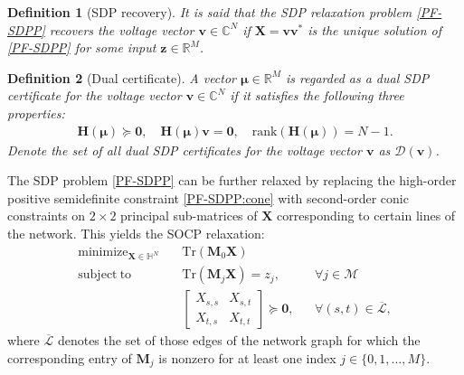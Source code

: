 \documentclass[journal,twoside]{IEEEtran}
\newtheorem{definition}{Definition}
\newcommand{\Tr}{\mathrm{Tr}}
\newcommand{\st}{\mathrm{subject~to}}
\newcommand{\bv}{\mathbf{v}}
\newcommand{\bz}{\mathbf{z}}
\newcommand{\bM}{\mathbf{M}}
\newcommand{\bX}{\mathbf{X}}
\newcommand{\cL}{{\mathcal L}}
\newcommand{\cM}{{\mathcal M}}
\DeclareMathOperator*{\mini}{\mathrm{minimize}}
\begin{document}
\begin{definition}[SDP recovery]
It is said that the SDP relaxation problem \eqref{PF-SDPP} recovers the voltage vector $\bv \in \mathbb{C}^N$ if $\bX=\bv\bv^{*}$ is the unique solution of \eqref{PF-SDPP} for some  input $\bz \in \mathbb{R}^M$.
\end{definition}



\begin{definition}[Dual certificate]
\label{dual_cer_def}
A vector $\boldsymbol{\mu}\in\mathbb{R}^M$ is regarded as a dual SDP certificate for the voltage vector $\mathbf{v}\in\mathbb{C}^N$ if it satisfies the following three properties:
\begin{align}\label{dual_cer}
\!\!\!\!
\mathbf{H}(\boldsymbol{\mu})\succeq \mathbf{0},\quad
\mathbf{H}(\boldsymbol{\mu})\mathbf{v}= \mathbf{0},\quad
\mathrm{rank}( \mathbf{H}(\boldsymbol{\mu}) )= N-1.\!\!
\end{align}
Denote the set of all dual SDP certificates for the voltage vector $\mathbf{v}$ as $\mathcal{D}(\mathbf{v})$.\vspace{-2mm}
\end{definition}	


The SDP problem \eqref{PF-SDPP} can be further relaxed by replacing the high-order positive semidefinite constraint \eqref{PF-SDPP:cone} with second-order conic constraints on $2\times 2$ principal sub-matrices of $\mathbf{X}$ corresponding to certain lines of the network. This yields the SOCP relaxation:
\begin{subequations}\label{PF-SOCP}
	\begin{align}
	\mini_{\bX \in \mathbb{H}^N}\quad &\Tr(\bM_0\bX) \label{PF-SOCP:obj} \\
	\st\quad  &\Tr(\bM_j\bX) = z_j,\, &&\forall j\in \cM \label{PF-SOCP:meq} \\
	\quad &
	\begin{bmatrix}
	X_{s,s} & X_{s,t}\\
	X_{t,s} &X_{t,t}
	\end{bmatrix}
	\succeq  \mathbf{0}, &&\forall(s,t) \in \overline\cL,\label{PF-SOCP:cone}
	\end{align}
\end{subequations}
where $\overline \cL$ denotes the set of those edges of the network graph for which
the corresponding entry of $\mathbf{M}_{j}$ is nonzero for at least one index $j \in \{0,1,\ldots,M\}$.

\end{document}
